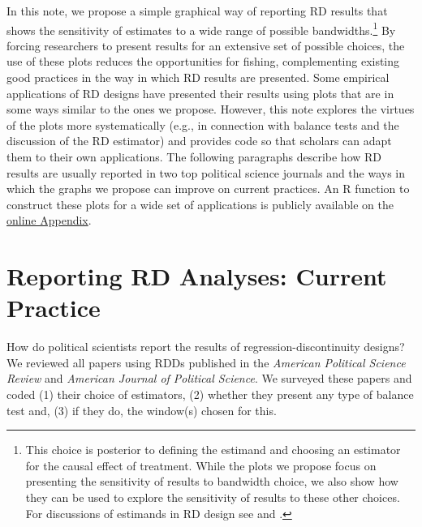 \documentclass[letterpaper,twoside,12pt]{article}\usepackage[]{graphicx}\usepackage[]{color}
\begin{document}
In this note, we propose a simple graphical way of reporting RD results that shows the sensitivity of estimates to a wide range of possible bandwidths.\footnote{This choice is posterior to defining the estimand and choosing an estimator for the causal effect of treatment. While the plots we propose focus on presenting the sensitivity of results to bandwidth choice, we also show how they can be used to explore the sensitivity of results to these other choices. For discussions of estimands in RD design see \citet{dunning2012natural} and \citet{calonico2015robust}.} By forcing researchers to present results for an extensive set of possible choices, the use of these plots reduces the opportunities for fishing, complementing existing good practices in the way in which RD results are presented. Some empirical applications of RD designs have presented their results using plots that are in some ways similar to the ones we propose. However, this note explores the virtues of the plots more systematically (e.g., in connection with balance tests and the discussion of the RD estimator) and provides code so that scholars can adapt them to their own applications. The following paragraphs describe how RD results are usually reported in two top political science journals and the ways in which the graphs we propose can improve on current practices. An R function to construct these plots for a wide set of applications is publicly available on the \href{https://github.com/nataliabueno/Graphical-Presentation-of-Regression-Discontinuity-Results}{online Appendix}.

\section*{Reporting RD Analyses: Current Practice}

How do political scientists report the results of regression-discontinuity designs? We reviewed all papers using RDDs published in the \emph{American Political Science Review} and \emph{American Journal of Political Science}.  We surveyed these papers and coded (1) their choice of estimators, (2) whether they present any type of balance test and, (3) if they do, the window(s) chosen for this.
\end{document}
